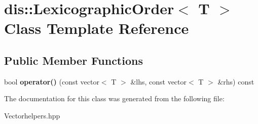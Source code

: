\hypertarget{classdis_1_1_lexicographic_order}{\section{dis\-:\-:Lexicographic\-Order$<$ T $>$ Class Template Reference}
\label{classdis_1_1_lexicographic_order}
}
\subsection*{Public Member Functions}
\begin{DoxyCompactItemize}
\item 
\hypertarget{classdis_1_1_lexicographic_order_a20ebef3e3dd0160e839c19c758c55c1a}{bool {\bfseries operator()} (const vector$<$ T $>$ \&lhs, const vector$<$ T $>$ \&rhs) const }\label{classdis_1_1_lexicographic_order_a20ebef3e3dd0160e839c19c758c55c1a}

\end{DoxyCompactItemize}


The documentation for this class was generated from the following file\-:\begin{DoxyCompactItemize}
\item 
Vectorhelpers.\-hpp\end{DoxyCompactItemize}
